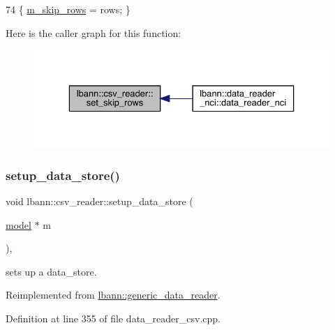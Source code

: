 \begin{DoxyCode}
74 \{ \hyperlink{classlbann_1_1csv__reader_a52b9eebd06309a8d8858ce74ecd8cce0}{m\_skip\_rows} = rows; \}
\end{DoxyCode}
Here is the caller graph for this function\+:\nopagebreak
\begin{figure}[H]
\begin{center}
\leavevmode
\includegraphics[width=329pt]{classlbann_1_1csv__reader_a7ec75f9bbf61073dd205871916578125_icgraph}
\end{center}
\end{figure}
\mbox{\label{classlbann_1_1csv__reader_a19175c31963be64ea602d49cfb37bc68}} 
\subsubsection{\texorpdfstring{setup\+\_\+data\+\_\+store()}{setup\_data\_store()}}
{\footnotesize\ttfamily void lbann\+::csv\+\_\+reader\+::setup\+\_\+data\+\_\+store (\begin{DoxyParamCaption}\item[{\hyperlink{classlbann_1_1model}{model} $\ast$}]{m }\end{DoxyParamCaption})\hspace{0.3cm}{\ttfamily [override]}, {\ttfamily [virtual]}}



sets up a data\+\_\+store. 



Reimplemented from \hyperlink{classlbann_1_1generic__data__reader_a8b2a09d38512fc11f1b9d572c89100a7}{lbann\+::generic\+\_\+data\+\_\+reader}.



Definition at line 355 of file data\+\_\+reader\+\_\+csv.\+cpp.


